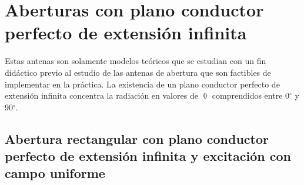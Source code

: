 \section{Aberturas con plano conductor perfecto de extensión infinita}
\label{sec_estudio_abert}

Estas antenas son solamente modelos teóricos que se estudian con un fin didáctico previo al estudio de las antenas de abertura que son factibles de implementar en la práctica. La existencia de un plano conductor perfecto de extensión infinita concentra la radiación en valores de $\uptheta$ comprendidos entre 0$^{\circ}$ y 90$^{\circ}$.

\subsection{Abertura rectangular con plano conductor perfecto de extensión infinita y excitación con campo uniforme}
\label{subsec_estudio_abert_rect_inf_uni}


